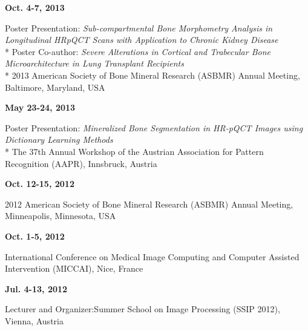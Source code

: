 \documentclass[line,a4paper]{resume}
\begin{document}
\begin{resume}
\noindent
\begin{minipage}[t]{0.20\linewidth}
\textbf{Oct. 4-7, 2013}
\end{minipage}
\begin{minipage}[t]{0.80\linewidth}\raggedright
Poster Presentation: \emph{Sub-compartmental Bone Morphometry Analysis in Longitudinal HRpQCT Scans with Application to Chronic Kidney Disease}\\*
Poster Co-author: \emph{Severe Alterations in Cortical and Trabecular Bone Microarchitecture in Lung Transplant Recipients}\\*
2013 American Society of Bone Mineral Research (ASBMR) Annual Meeting, Baltimore, Maryland, USA
\end{minipage}

\noindent
\begin{minipage}[t]{0.20\linewidth}
\textbf{May 23-24, 2013}
\end{minipage}
\begin{minipage}[t]{0.80\linewidth}\raggedright
Poster Presentation: \emph{Mineralized Bone Segmentation in HR-pQCT Images using Dictionary Learning Methods}\\*
The 37th Annual Workshop of the Austrian Association for Pattern Recognition (AAPR), Innsbruck, Austria
\end{minipage}

\noindent
\begin{minipage}[t]{0.20\linewidth}
\textbf{Oct. 12-15, 2012}
\end{minipage}
\begin{minipage}[t]{0.80\linewidth}\raggedright
2012 American Society of Bone Mineral Research (ASBMR) Annual Meeting, Minneapolis, Minnesota, USA
\end{minipage}

\noindent
\begin{minipage}[t]{0.20\linewidth}
\textbf{Oct. 1-5, 2012}
\end{minipage}
\begin{minipage}[t]{0.80\linewidth}\raggedright
International Conference on Medical Image Computing and Computer Assisted Intervention (MICCAI), Nice, France
\end{minipage}

\noindent
\begin{minipage}[t]{0.20\linewidth}
\textbf{Jul. 4-13, 2012}
\end{minipage}
\begin{minipage}[t]{0.80\linewidth}\raggedright
Lecturer and Organizer:Summer School on Image Processing (SSIP 2012), Vienna, Austria
\end{minipage}


\end{resume}
\end{document}
